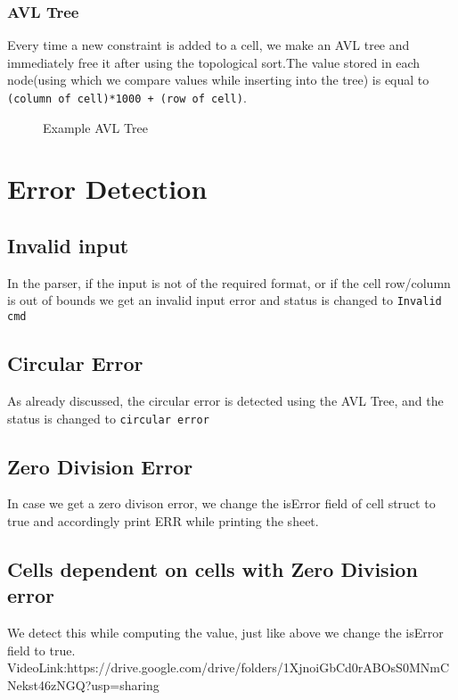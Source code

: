 \documentclass{article}
\begin{document}
\subsubsection{AVL Tree}
    Every time a new constraint is added to a cell, we make an AVL tree and immediately free it after using the topological sort.The value stored in each node(using which we compare values while inserting into the tree) is equal to \texttt{(column of cell)*1000 + (row of cell)}.

    \begin{figure}[H]
        \centering
        \caption{Example AVL Tree}
        \label{fig:enter-label}
    \end{figure}

    
\section{Error Detection}
    \subsection{Invalid input}
        In the parser, if the input is not of the required format, or if the cell row/column is out of bounds we get an invalid input error and status is changed to \texttt{Invalid cmd}

    \subsection{Circular Error}
        As already discussed, the circular error is detected using the AVL Tree, and the status is changed to \texttt{circular error}

    \subsection{Zero Division Error}
        In case we get a zero divison error, we change the isError field of cell struct to true and accordingly print ERR while printing the sheet.

    \subsection{Cells dependent on cells with Zero Division error}
        We detect this while computing the value, just like above we change the isError field to true.
    \\
        VideoLink:https://drive.google.com/drive/folders/1XjnoiGbCd0rABOsS0MNmCNekst46zNGQ?usp=sharing
\end{document}

